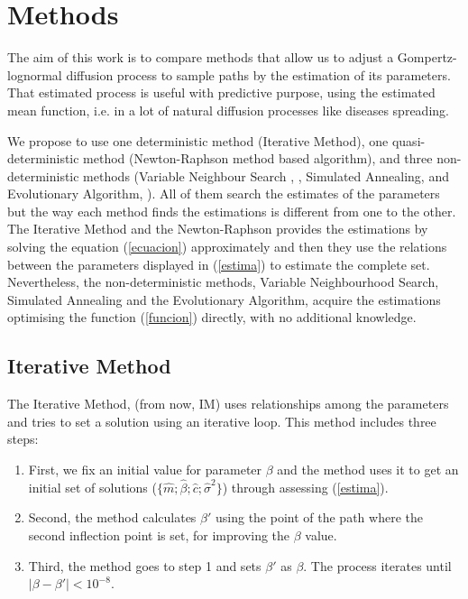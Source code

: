 \documentclass{sig-alternate}
\begin{document}
\section{Methods}
\label{sec:methods}

The aim of this work is to compare methods that allow us to adjust a Gompertz-lognormal diffusion process to sample paths by the estimation of its parameters. That estimated process is useful with predictive purpose, using the estimated mean function, i.e. in a lot of natural diffusion processes like diseases spreading.

We propose to use one deterministic method (Iterative Method), one quasi-deterministic method (Newton-Raphson method based algorithm), and three non-deterministic methods (Variable Neighbour Search , \cite{VNS}, Simulated Annealing, \cite{SA} and Evolutionary Algorithm, \cite{EA}). All of them search the estimates of the parameters but the way each method finds the estimations is different from one to the other. The Iterative Method and the Newton-Raphson  provides the estimations by solving the equation (\ref{ecuacion}) approximately and then they use the relations between the parameters displayed in (\ref{estima}) to estimate the complete set. Nevertheless, the non-deterministic methods, Variable Neighbourhood Search, Simulated Annealing and the Evolutionary Algorithm, acquire the estimations optimising the function (\ref{funcion}) directly, with no additional knowledge.


\subsection{Iterative Method}
\label{subsec:iterative}
The Iterative Method, (from now, IM) uses relationships among the parameters and tries to set a solution using an iterative loop.  This method includes three steps:

\begin{enumerate}
\item First, we fix an initial value for parameter $\beta$ and the method uses it to get an initial set of solutions ($\{\hat{m}; \hat{\beta}; \hat{c}; \hat{\sigma}^2\}$) through assessing (\ref{estima}).
\item Second, the method calculates $\beta'$ using the point of the path where the second inflection point is set, for improving the $\beta$ value.
\item Third,  the method goes to step 1 and sets $\beta'$ as $\beta$. The process iterates until $|\beta-\beta'|<10^{-8}$.

\end{enumerate}
\end{document}
